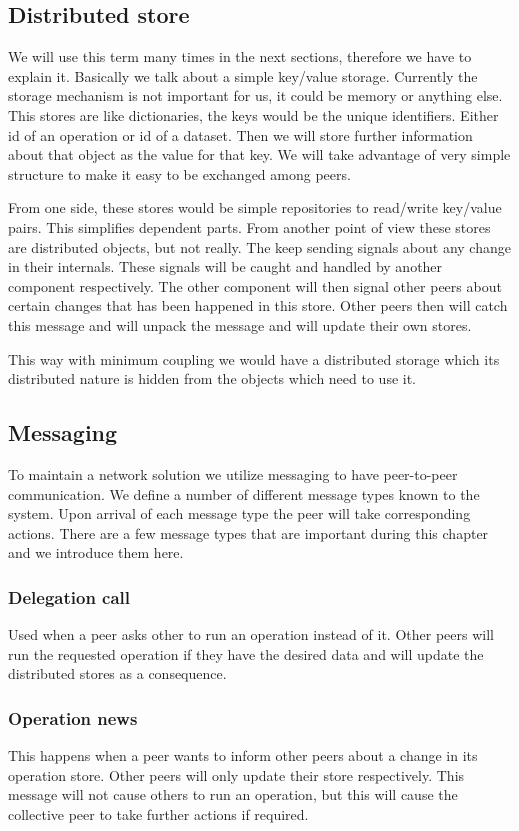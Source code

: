 \subsection{Distributed store}
We will use this term many times in the next sections, therefore we have to explain it.
Basically we talk about a simple key/value storage. 
Currently the storage mechanism is not important for us, it could be memory or anything else.
This stores are like dictionaries, the keys would be the unique identifiers.
Either id of an operation or id of a dataset. 
Then we will store further information about that object as the value for that key.
We will take advantage of very simple structure to make it easy to be exchanged among peers.

From one side, these stores would be simple repositories to read/write key/value pairs.
This simplifies dependent parts.
From another point of view these stores are distributed objects, but not really.
The keep sending signals about any change in their internals.
These signals will be caught and handled by another component respectively.
The other component will then signal other peers about certain changes that has been happened in this store.
Other peers then will catch this message and will unpack the message and will update their own stores.

This way with minimum coupling we would have a distributed storage which its distributed nature is hidden from
the objects which need to use it.

\subsection{Messaging}
To maintain a network solution we utilize messaging to have peer-to-peer communication. 
We define a number of different message types known to the system. 
Upon arrival of each message type the peer will take corresponding actions.
There are a few message types that are important during this chapter and we introduce them here.

\subsubsection{Delegation call}
Used when a peer asks other to run an operation instead of it.
Other peers will run the requested operation if they have the desired data and will update
the distributed stores as a consequence.

\subsubsection{Operation news}
This happens when a peer wants to inform other peers about a change in its operation store.
Other peers will only update their store respectively.
This message will not cause others to run an operation, 
but this will cause the collective peer to take further actions if required.

